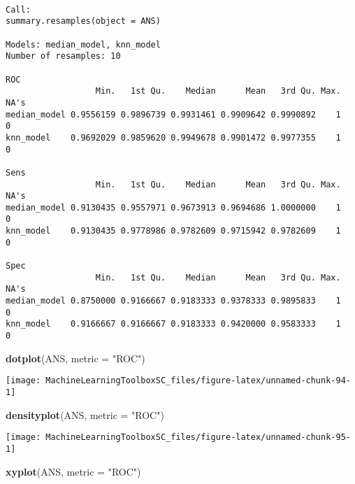 \documentclass[]{book}
\newenvironment{Shaded}{\begin{snugshade}}{\end{snugshade}}
\newcommand{\KeywordTok}[1]{\textcolor[rgb]{0.13,0.29,0.53}{\textbf{#1}}}
\newcommand{\DataTypeTok}[1]{\textcolor[rgb]{0.13,0.29,0.53}{#1}}
\newcommand{\StringTok}[1]{\textcolor[rgb]{0.31,0.60,0.02}{#1}}
\newcommand{\NormalTok}[1]{#1}
\begin{document}
\begin{verbatim}

Call:
summary.resamples(object = ANS)

Models: median_model, knn_model 
Number of resamples: 10 

ROC 
                  Min.   1st Qu.    Median      Mean   3rd Qu. Max. NA's
median_model 0.9556159 0.9896739 0.9931461 0.9909642 0.9990892    1    0
knn_model    0.9692029 0.9859620 0.9949678 0.9901472 0.9977355    1    0

Sens 
                  Min.   1st Qu.    Median      Mean   3rd Qu. Max. NA's
median_model 0.9130435 0.9557971 0.9673913 0.9694686 1.0000000    1    0
knn_model    0.9130435 0.9778986 0.9782609 0.9715942 0.9782609    1    0

Spec 
                  Min.   1st Qu.    Median      Mean   3rd Qu. Max. NA's
median_model 0.8750000 0.9166667 0.9183333 0.9378333 0.9895833    1    0
knn_model    0.9166667 0.9166667 0.9183333 0.9420000 0.9583333    1    0
\end{verbatim}

\begin{Shaded}
\begin{Highlighting}[]
\KeywordTok{dotplot}\NormalTok{(ANS, }\DataTypeTok{metric =} \StringTok{"ROC"}\NormalTok{)}
\end{Highlighting}
\end{Shaded}

\begin{center}\texttt{[image: MachineLearningToolboxSC\_files/figure-latex/unnamed-chunk-94-1]} \end{center}

\begin{Shaded}
\begin{Highlighting}[]
\KeywordTok{densityplot}\NormalTok{(ANS, }\DataTypeTok{metric =} \StringTok{"ROC"}\NormalTok{)}
\end{Highlighting}
\end{Shaded}

\begin{center}\texttt{[image: MachineLearningToolboxSC\_files/figure-latex/unnamed-chunk-95-1]} \end{center}

\begin{Shaded}
\begin{Highlighting}[]
\KeywordTok{xyplot}\NormalTok{(ANS, }\DataTypeTok{metric =} \StringTok{"ROC"}\NormalTok{)}
\end{Highlighting}
\end{Shaded}
\end{document}
